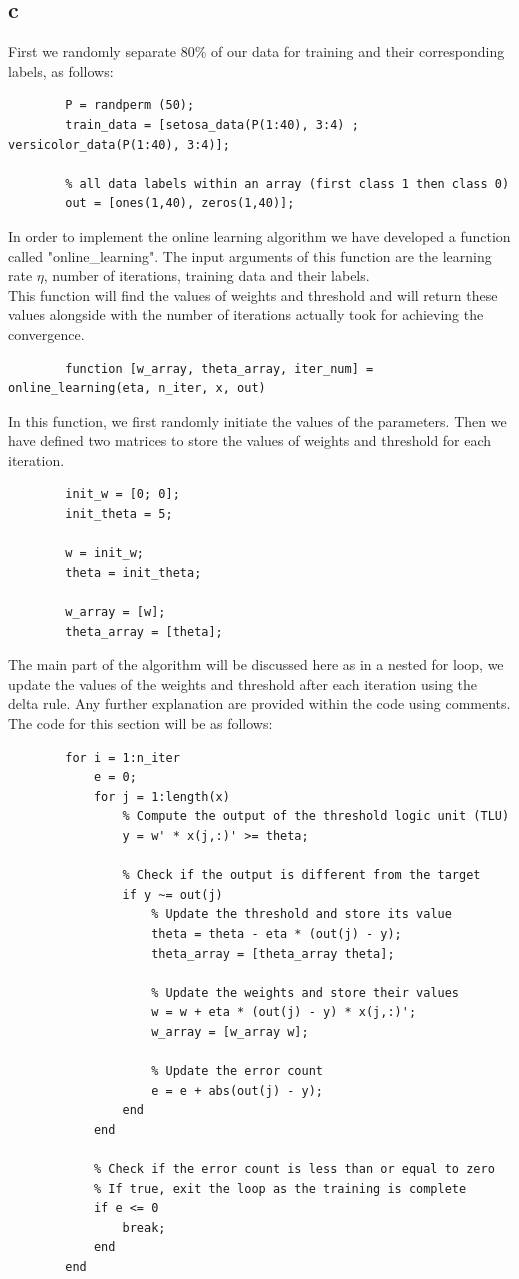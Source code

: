 \documentclass[]{article}
\begin{document}
	\subsection*{c}
	First we randomly separate 80\% of our data for training and their corresponding labels, as follows:
	\begin{lstlisting}
		P = randperm (50);
		train_data = [setosa_data(P(1:40), 3:4) ; versicolor_data(P(1:40), 3:4)];
		
		% all data labels within an array (first class 1 then class 0)
		out = [ones(1,40), zeros(1,40)];
	\end{lstlisting}
	In order to implement the online learning algorithm we have developed a function called "online\_learning". The input arguments of this function are the learning rate $\eta$, number of iterations, training data and their labels.\\
	This function will find the values of weights and threshold and will return these values alongside with the number of iterations actually took for achieving the convergence.
	\begin{lstlisting}
		function [w_array, theta_array, iter_num] = online_learning(eta, n_iter, x, out)
	\end{lstlisting}
	In this function, we first randomly initiate the values of the parameters. Then we have defined two matrices to store the values of weights and threshold for each iteration.
	\begin{lstlisting}
		init_w = [0; 0];
		init_theta = 5;
		
		w = init_w;
		theta = init_theta;
		
		w_array = [w];
		theta_array = [theta];
	\end{lstlisting}
	The main part of the algorithm will be discussed here as in a nested for loop, we update the values of the weights and threshold after each iteration using the delta rule. Any further explanation are provided within the code using comments. The code for this section will be as follows:
	\begin{lstlisting}
		for i = 1:n_iter
			e = 0;
			for j = 1:length(x)
				% Compute the output of the threshold logic unit (TLU)
				y = w' * x(j,:)' >= theta;
				
				% Check if the output is different from the target
				if y ~= out(j)
					% Update the threshold and store its value
					theta = theta - eta * (out(j) - y);
					theta_array = [theta_array theta];
					
					% Update the weights and store their values
					w = w + eta * (out(j) - y) * x(j,:)';
					w_array = [w_array w];
					
					% Update the error count
					e = e + abs(out(j) - y);
				end
			end
			
			% Check if the error count is less than or equal to zero
			% If true, exit the loop as the training is complete
			if e <= 0
				break;
			end
		end
	\end{lstlisting}
\end{document}
